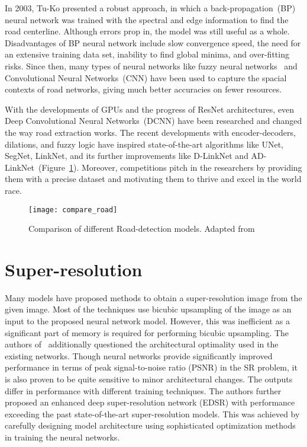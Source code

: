In 2003, Tu-Ko presented a robust approach, in which a back-propagation~(BP) neural network was trained with the spectral and edge information to find the road centerline. Although errors prop in, the model was still useful as a whole. Disadvantages of BP neural network include slow convergence speed, the need for an extensive training data set, inability to find global minima, and over-fitting risks. Since then, many types of neural networks like fuzzy neural networks~\cite{mokhtarzade2008automatic} and Convolutional Neural Networks~(CNN) have been used to capture the spacial contexts of road networks, giving much better accuracies on fewer resources.

With the developments of GPUs and the progress of ResNet architectures, even Deep Convolutional Neural Networks~(DCNN) have been researched and changed the way road extraction works. The recent developments with encoder-decoders, dilations, and fuzzy logic have inspired state-of-the-art algorithms like UNet, SegNet, LinkNet, and its further improvements like D-LinkNet and AD-LinkNet~(Figure~\ref{fig:compare_road}). Moreover, competitions pitch in the researchers by providing them with a precise dataset and motivating them to thrive and excel in the world race.

\begin{figure}[h!]
  \centering
  \texttt{[image: compare\_road]}
  \caption[Comparison of different Road-detection models]{Comparison of different Road-detection models. Adapted from~\cite{AD-LinkNet}}
  \label{fig:compare_road}
\end{figure}


\section{Super-resolution}
Many models have proposed methods to obtain a super-resolution image from the given image. Most of the techniques use bicubic upsampling of the image as an input to the proposed neural network model. However, this was inefficient as a significant part of memory is required for performing bicubic upsampling. The authors of~\cite{EDSR} additionally questioned the architectural optimality used in the existing networks. Though neural networks provide significantly improved performance in terms of peak signal-to-noise ratio (PSNR) in the SR problem, it is also proven to be quite sensitive to minor architectural changes. The outputs differ in performance with different training techniques. The authors further proposed an enhanced deep super-resolution network (EDSR) with performance exceeding the past state-of-the-art super-resolution models. This was achieved by carefully designing model architecture using sophisticated optimization methods in training the neural networks.

